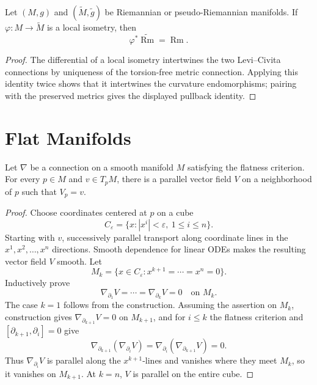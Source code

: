 \begin{proposition}
\label{prop:curvature-isometry-invariant}
Let $(M,g)$ and $(\widetilde M,\widetilde g)$ be Riemannian or
pseudo-Riemannian manifolds. If
$\varphi\colon M\to\widetilde M$ is a local isometry, then
\[
\varphi^*\widetilde{\operatorname{Rm}}=\operatorname{Rm}.
\]
\end{proposition}
\begin{proof}
\sketch
The differential of a local isometry intertwines the two Levi--Civita
connections by uniqueness of the torsion-free metric connection. Applying
this identity twice shows that it intertwines the curvature endomorphisms;
pairing with the preserved metrics gives the displayed pullback identity.
\end{proof}

\section{Flat Manifolds}

\begin{lemma}
\label{lem:parallel-vector-field-flatness}

Let $\nabla$ be a connection on a smooth manifold $M$ satisfying the flatness
criterion. For every $p\in M$ and $v\in T_pM$, there is a parallel vector field
$V$ on a neighborhood of $p$ such that $V_p=v$.
\end{lemma}

\begin{proof}
\sketch Choose coordinates centered at $p$ on a cube
\[
C_\varepsilon=\{x:|x^i|<\varepsilon,\ 1\leq i\leq n\}.
\]
Starting with $v$, successively parallel transport along coordinate lines in
the $x^1,x^2,\ldots,x^n$ directions. Smooth dependence for linear ODEs makes
the resulting vector field $V$ smooth. Let
\[
M_k=\{x\in C_\varepsilon:x^{k+1}=\cdots=x^n=0\}.
\]
Inductively prove
\begin{equation}
\nabla_{\partial_1}V=\cdots=\nabla_{\partial_k}V=0
\quad\text{on }M_k. \tag{7.9}
\end{equation}
The case $k=1$ follows from the construction. Assuming the assertion on
$M_k$, construction gives $\nabla_{\partial_{k+1}}V=0$ on $M_{k+1}$, and for
$i\leq k$ the flatness criterion and
$[\partial_{k+1},\partial_i]=0$ give
\[
\nabla_{\partial_{k+1}}(\nabla_{\partial_i}V)
=\nabla_{\partial_i}(\nabla_{\partial_{k+1}}V)=0.
\]
Thus $\nabla_{\partial_i}V$ is parallel along the $x^{k+1}$-lines and vanishes
where they meet $M_k$, so it vanishes on $M_{k+1}$. At $k=n$, $V$ is parallel
on the entire cube.
\end{proof}

